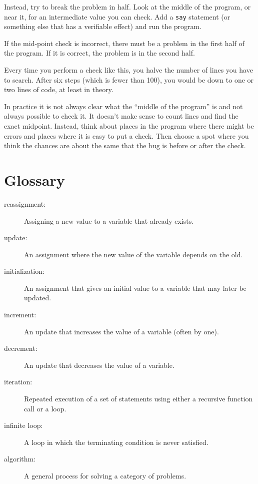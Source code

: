 Instead, try to break the problem in half.  Look at the middle
of the program, or near it, for an intermediate value you
can check.  Add a {\tt say} statement (or something else
that has a verifiable effect) and run the program.

If the mid-point check is incorrect, there must be a problem in the
first half of the program.  If it is correct, the problem is
in the second half.

Every time you perform a check like this, you halve the number of
lines you have to search.  After six steps (which is fewer than 100),
you would be down to one or two lines of code, at least in theory.

In practice it is not always clear what
the ``middle of the program'' is and not always possible to
check it.  It doesn't make sense to count lines and find the
exact midpoint.  Instead, think about places
in the program where there might be errors and places where it
is easy to put a check.  Then choose a spot where you
think the chances are about the same that the bug is before
or after the check.


\section{Glossary}

\begin{description}

\item[reassignment:] Assigning a new value to a variable that
already exists.

\item[update:] An assignment where the new value of the variable
depends on the old.

\item[initialization:] An assignment that gives an initial value to
a variable that may later be updated.

\item[increment:] An update that increases the value of a variable
(often by one).

\item[decrement:] An update that decreases the value of a variable.

\item[iteration:] Repeated execution of a set of statements using
either a recursive function call or a loop.

\item[infinite loop:] A loop in which the terminating condition is
never satisfied.

\item[algorithm:]  A general process for solving a category of
problems.

\end{description}


